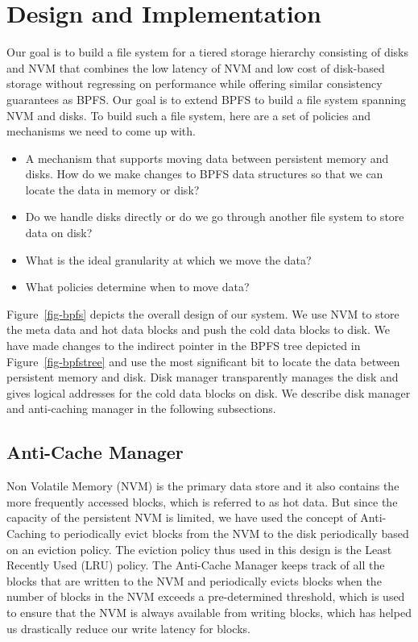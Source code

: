 \section{Design and Implementation}
\label{sec-design}
Our goal is to build a file system for a tiered storage hierarchy consisting of disks and NVM that combines the low latency of NVM and low cost of disk-based storage without regressing on performance while offering similar consistency guarantees as BPFS. Our goal is to extend BPFS to build a file system spanning NVM and disks. To build such a file system, here are a set of policies and mechanisms we need to come up with.

\begin{itemize}
\item A mechanism that supports moving data between persistent memory and disks. How do we make changes to BPFS data structures so that we can locate the data in memory or disk?
\item Do we handle disks directly or do we go through another file system to store data on disk?
\item What is the ideal granularity at which we move the data? 
\item What policies determine when to move data?
\end{itemize}

Figure~\ref{fig-bpfs} depicts the overall design of our system. We use NVM to store the meta data and hot data blocks and push the cold data blocks to disk. We have made changes to the indirect pointer in the BPFS tree depicted in Figure~\ref{fig-bpfstree} and use the most significant bit to locate the data between persistent memory and disk. Disk manager transparently manages the disk and gives logical addresses for the cold data blocks on disk. We describe disk manager and anti-caching manager in the following subsections.

\subsection{Anti-Cache Manager}
Non Volatile Memory (NVM) is the primary data store and it also contains the more frequently accessed blocks, which is referred to as hot data. But since the capacity of the persistent NVM is limited, we have used the concept of Anti-Caching to periodically evict blocks from the NVM to the disk periodically based on an eviction policy. The eviction policy thus used in this design is the Least Recently Used (LRU) policy. The Anti-Cache Manager keeps track of all the blocks that are written to the NVM and periodically evicts blocks when the number of blocks in the NVM exceeds a pre-determined threshold, which is used to ensure that the NVM is always available from writing blocks, which has helped us drastically reduce our write latency for blocks.

